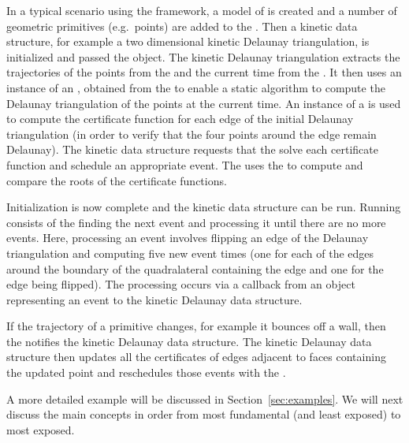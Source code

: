 In a typical scenario using the framework, a model of
 is created and a number of geometric primitives
(e.g.\ points) are added to the
. Then a kinetic data
structure, for example a two dimensional kinetic Delaunay
triangulation, is initialized and passed the 
object. The kinetic Delaunay triangulation extracts the trajectories
of the points from the  and
the current time from the . It then uses an instance of
an , obtained from the 
to enable a static algorithm to compute the Delaunay triangulation of
the points at the current time. An instance of a 
is used to compute the  certificate function for each
edge of the initial Delaunay triangulation (in order to verify that
the four points around the edge remain Delaunay). The kinetic data
structure requests that the  solve each certificate
function and schedule an appropriate event. The  uses
the  to compute and compare the roots of the
certificate functions.

Initialization is now complete and the kinetic data structure can be
run. Running consists of the  finding the next event
and processing it until there are no more events. Here, processing an
event involves flipping an edge of the Delaunay triangulation and
computing five new event times (one for each of the edges around the
boundary of the quadralateral containing the edge and one for the edge
being flipped). The processing occurs via a callback from an object
representing an event to the kinetic Delaunay data structure.

If the trajectory of a primitive changes, for example it bounces
off a wall, then the  notifies the kinetic Delaunay data
structure. The kinetic Delaunay data structure then updates all the
certificates of edges adjacent to faces containing the updated point and
reschedules those events with the .

A more detailed example will be discussed in
Section~\ref{sec:examples}. We will next discuss the main concepts in
order from most fundamental (and least exposed) to most exposed.

